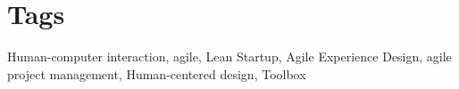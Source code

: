 \section*{Tags}
Human-computer interaction, agile, Lean Startup, Agile Experience Design, agile project management, Human-centered design, Toolbox